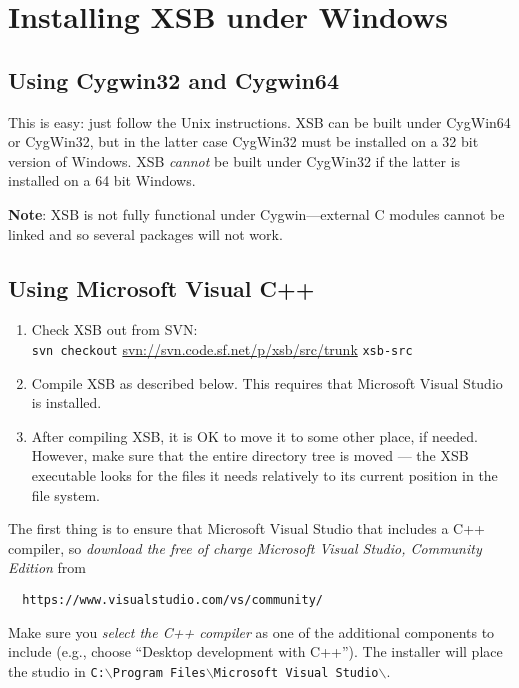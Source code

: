 \section{Installing XSB under Windows}
\subsection{Using Cygwin32 and Cygwin64}
\label{quick:cygwin}

This is easy: just follow the Unix instructions.
XSB can be built under CygWin64 or CygWin32, but in the latter case
CygWin32 must be installed on a 32 bit version of Windows.
XSB \emph{cannot} be built under CygWin32 if the latter is installed on a
64 bit Windows.

\noindent
\textbf{Note}: XSB is not fully functional under Cygwin---external C modules
cannot be linked and so several packages will not work.

\subsection{Using Microsoft Visual C++}
\label{quick:DOS}

\begin{enumerate}
\item Check XSB out from SVN:\\
  \texttt{svn checkout} \url{svn://svn.code.sf.net/p/xsb/src/trunk} \texttt{xsb-src}
\item Compile XSB as described below.
  This requires that Microsoft Visual Studio is installed.
\item After compiling XSB, it is OK to move it to some other place, if needed.
   However, make sure that the
   entire directory tree is moved --- the XSB executable looks for the files it
   needs relatively to its current position in the file system.
\end{enumerate}


The first thing is to ensure that
Microsoft Visual Studio that includes a C++ compiler, so
\emph{download the free of charge Microsoft Visual Studio, Community
    Edition} from
\begin{verbatim}
  https://www.visualstudio.com/vs/community/
\end{verbatim}
Make sure you \emph{select the C++ compiler}   as one of the additional components
to include (e.g., choose ``Desktop development with C++'').
The installer will place the studio in
\texttt{C:$\backslash$Program Files$\backslash$Microsoft Visual
  Studio$\backslash$}.


